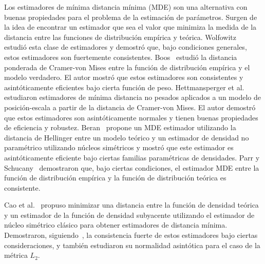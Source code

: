 Los estimadores de mínima distancia mínima (MDE) son una  alternativa con buenas propiedades para el problema de la estimación de parámetros.
Surgen de la idea de encontrar un estimador que sea el valor que minimiza la medida de la distancia entre las funciones de distribución empírica y teórica.
Wolfowitz~\cite{wolfowitz1953, wolfowitz1957} estudió esta clase de estimadores y demostró que, bajo condiciones generales, estos estimadores son fuertemente consistentes. 
Boos~\cite{Boos1981} estudió la distancia ponderada de Cramer-von Mises entre la función de distribución empírica y el modelo verdadero.
El autor mostró que estos estimadores son consistentes y asintóticamente eficientes bajo cierta función de peso.
Hettmansperger et al.~\cite{HettmanSperger1994} estudiaron estimadores de mínima distancia no pesados aplicados a un modelo de posición-escala a partir de la distancia de Cramer-von Mises. El autor demostró que estos estimadores son asintóticamente normales y tienen buenas propiedades de eficiencia y robustez.
Beran~\cite{beran1977} propone un MDE estimador utilizando la distancia de Hellinger entre un modelo teórico y un estimador de densidad no paramétrico utilizando núcleos simétricos y mostró que este estimador es asintóticamente eficiente bajo ciertas familias paramétricas de densidades.
Parr y Schucany~\cite{parr1982} demostraron que, bajo ciertas condiciones, el estimador MDE entre la función de distribución empírica y la función de distribución teórica es consistente.

Cao et al.~\cite{cao1995minimum} propuso minimizar una distancia entre la función de densidad teórica y un estimador de la función de densidad subyacente utilizando el estimador de núcleo simétrico clásico para obtener estimadores de distancia mínima. Demostraron, siguiendo~\cite{parr1982}, la consistencia fuerte de estos estimadores bajo ciertas consideraciones, y también estudiaron su normalidad asintótica para el caso de la métrica $ L_2 $.


